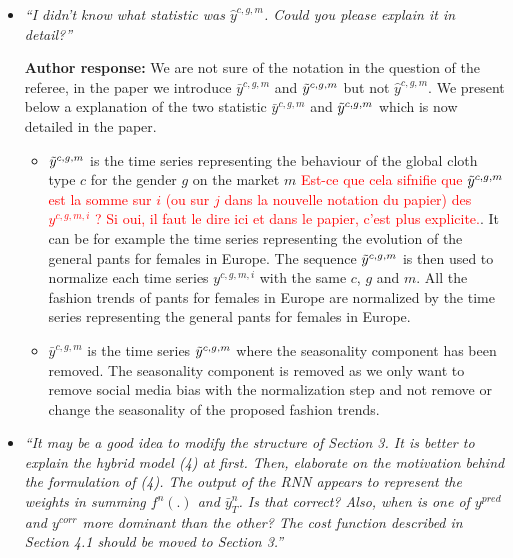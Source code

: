 \documentclass[10pt]{article} %
\begin{document}
\begin{itemize}
	\item {\em ``I didn't know what statistic was $\hat{y}^{c,g,m}$. Could you please explain it in detail?''} \medskip

	\textbf{Author response:} We are not sure of the notation in the question of the referee, in the paper we introduce $\bar{y}^{c,g,m}$ and $\Tilde{y}^{c,g,m}$ but not $\hat{y}^{c,g,m}$. We present below a explanation of the two statistic $\bar{y}^{c,g,m}$ and $\Tilde{y}^{c,g,m}$ which is now detailed in the paper.
	\begin{itemize}
	\item $\Tilde{y}^{c,g,m}$ is the time series representing the behaviour of the global cloth type $c$ for the gender $g$ on the market $m$ \textcolor{red}{Est-ce que cela sifnifie que $\Tilde{y}^{c,g,m}$  est la somme sur $i$ (ou sur $j$ dans la nouvelle notation du papier) des $y^{c,g,m,i}$ ? Si oui, il faut le dire ici et dans le papier, c'est plus explicite.}. It can be for example the time series representing the evolution of the general pants for females in Europe. The sequence $\Tilde{y}^{c,g,m}$ is then used to normalize each time series $y^{c,g,m,i}$ with the same $c$, $g$ and $m$. All the fashion trends of pants for females in Europe are normalized by the time series representing the general pants for females in Europe.
	\item $\bar{y}^{c,g,m}$ is the time series $\Tilde{y}^{c,g,m}$ where the seasonality component has been removed. The seasonality component is removed as we only want to remove social media bias with the normalization step and not remove or change the seasonality of the proposed fashion trends.
	\end{itemize}	

	\item {\em ``It may be a good idea to modify the structure of Section 3. It is better to explain the hybrid model (4) at first.  Then, elaborate on the motivation behind the formulation of (4). The output of the RNN appears to represent the weights in summing $f^n(.)$ and $\bar{y}^n_{T}$. Is that correct? Also, when is one of $y^{pred}$ and $y^{corr}$ more dominant than the other? The cost function described in Section 4.1 should be moved to Section 3.''} \medskip


\end{itemize}
\end{document}
